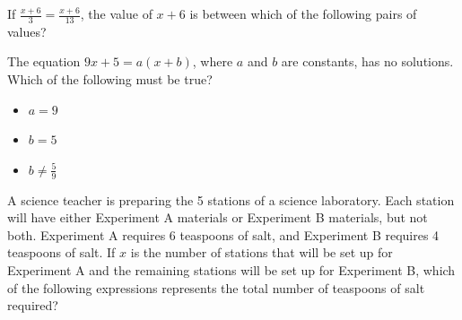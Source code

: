 If \( \frac{x + 6}{3} = \frac{x + 6}{13} \), the value of \( x + 6 \) is between which of the following pairs of values?

\vspace{0.75em}


\vspace{2em}


\noindent\markforreview

\vspace{1em}

The equation \( 9x + 5 = a(x + b) \), where \( a \) and \( b \) are constants, has no solutions.  
Which of the following must be true?

\begin{itemize}
  \item[I.] \( a = 9 \)
  \item[II.] \( b = 5 \)
  \item[III.] \( b \ne \frac{5}{9} \)
\end{itemize}

\vspace{0.75em}


\newpage
\noindent\markforreview

\vspace{1em}

A science teacher is preparing the 5 stations of a science laboratory. Each station will have either Experiment A materials or Experiment B materials, but not both. Experiment A requires 6 teaspoons of salt, and Experiment B requires 4 teaspoons of salt. If \( x \) is the number of stations that will be set up for Experiment A and the remaining stations will be set up for Experiment B, which of the following expressions represents the total number of teaspoons of salt required?

\vspace{0.75em}


\newpage
